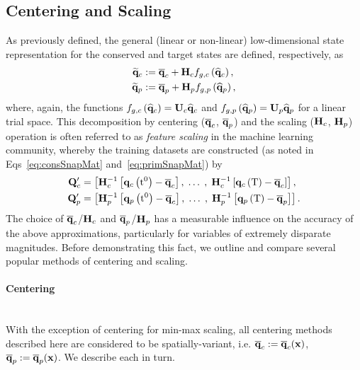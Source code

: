 \subsection{Centering and Scaling}\label{subsec:centerScale}
%
As previously defined, the general (linear or non-linear) low-dimensional state representation for the conserved and target states are defined, respectively, as
%
\begin{align}
	\consVecRom &\defEq \consVecCent + \consScale \nnLayer_{\decoderVar,\consVar}\left(\consVecCoef\right), \\
	\primVecRom &\defEq \primVecCent + \primScale \nnLayer_{\decoderVar,\primVar} \left(\primVecCoef\right),
\end{align}
%
where, again, the functions $\nnLayer_{\decoderVar,\consVar}\left(\consVecCoef\right) = \consTrial \consVecCoef$ and $\nnLayer_{\decoderVar,\primVar}\left(\primVecCoef\right) = \primTrial \primVecCoef$ for a linear trial space. This decomposition by centering ($\mathbf{\overline{q}}_{c}$, $\mathbf{\overline{q}}_{p}$) and the scaling ($\consScale$, $\primScale$) operation is often referred to as \textit{feature scaling} in the machine learning community, whereby the training datasets are constructed (as noted in Eqs~\ref{eq:consSnapMat} and~\ref{eq:primSnapMat}) by
%
\begin{align}
	\consDataMatUns &= \left[ \consScaleInv\left[\consFunc{\initTime} - \consVecCent\right], \; \hdots \; , \; \consScaleInv\left[\consFunc{\finalTime} - \consVecCent \right] \right], \\
	\primDataMatUns &= \left[ \primScaleInv\left[\primFunc{\initTime} - \consVecCent\right], \; \hdots \; , \; \primScaleInv\left[\primFunc{\finalTime} - \primVecCent \right] \right].
\end{align}
%
The choice of $\mathbf{\overline{q}}_{c}$/$\consScale$ and $\mathbf{\overline{q}}_{p}$/$\primScale$ has a measurable influence on the accuracy of the above approximations, particularly for variables of extremely disparate magnitudes. Before demonstrating this fact, we outline and compare several popular methods of centering and scaling.

\paragraph*{Centering}\mbox{}\\
%
With the exception of centering for min-max scaling, all centering methods described here are considered to be spatially-variant, i.e. $\mathbf{\overline{q}}_{c} := \mathbf{\overline{q}}_{c}(\mathbf{x})$, $\mathbf{\overline{q}}_{p} := \mathbf{\overline{q}}_{p}(\mathbf{x})$. We describe each in turn.

